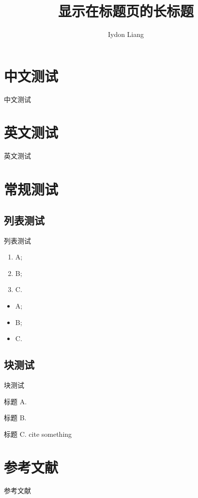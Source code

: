\documentclass{ctexbeamer}
\title[短标题]{显示在标题页的长标题}
\author[Iydon]{Iydon Liang}
\institute[SUSTech]{Southern University of Science and Technology}
\begin{document}
\section{中文测试}
  \begin{frame}{中文测试}
    \zhlipsum[1]
  \end{frame}

\section{英文测试}
  \begin{frame}{英文测试}
    \lipsum[1]
  \end{frame}

\section{常规测试}
  \subsection{列表测试}
    \begin{frame}[<+->][t]{列表测试}
        \begin{enumerate}
        \item A;
        \item B;
        \item C.
        \end{enumerate}
        \begin{itemize}
        \item A;
        \item B;
        \item C.
        \end{itemize}
    \end{frame}

  \subsection{块测试}
    \begin{frame}[<+->][t]{块测试}
        \begin{block}{标题}
        A.
        \end{block}
        \begin{block}{标题}
        B.
        \end{block}
        \begin{block}{标题}
        C. cite something\cite{Nicholas1998Handbook}
        \end{block}
    \end{frame}

\section{参考文献}
  \begin{frame}[t,allowframebreaks]{参考文献}
    \printbibliography[]
  \end{frame}
    
\end{document}
